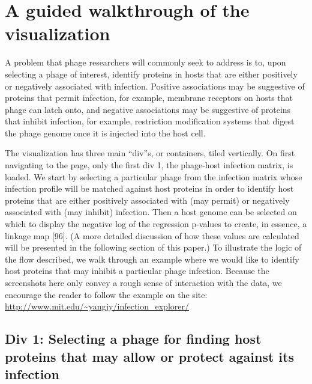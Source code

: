 \documentclass[12pt,twoside]{mitthesis-manusdown}
\begin{document}
\section{A guided walkthrough of the
visualization}\label{a-guided-walkthrough-of-the-visualization}

A problem that phage researchers will commonly seek to address is to,
upon selecting a phage of interest, identify proteins in hosts that are
either positively or negatively associated with infection. Positive
associations may be suggestive of proteins that permit infection, for
example, membrane receptors on hosts that phage can latch onto, and
negative associations may be suggestive of proteins that inhibit
infection, for example, restriction modification systems that digest the
phage genome once it is injected into the host cell.

The visualization has three main ``div''s, or containers, tiled
vertically. On first navigating to the page, only the first div 1, the
phage-host infection matrix, is loaded. We start by selecting a
particular phage from the infection matrix whose infection profile will
be matched against host proteins in order to identify host proteins that
are either positively associated with (may permit) or negatively
associated with (may inhibit) infection. Then a host genome can be
selected on which to display the negative log of the regression p-values
to create, in essence, a linkage map {[}96{]}. (A more detailed
discussion of how these values are calculated will be presented in the
following section of this paper.) To illustrate the logic of the flow
described, we walk through an example where we would like to identify
host proteins that may inhibit a particular phage infection. Because the
screenshots here only convey a rough sense of interaction with the data,
we encourage the reader to follow the example on the site:
\url{http://www.mit.edu/~yangjy/infection_explorer/}

\subsection{Div 1: Selecting a phage for finding host proteins that may
allow or protect against its
infection}\label{div-1-selecting-a-phage-for-finding-host-proteins-that-may-allow-or-protect-against-its-infection}
\end{document}

